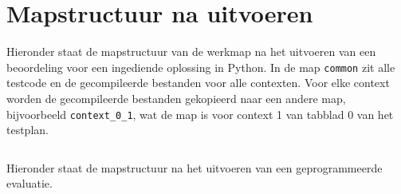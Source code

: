\chapter{Mapstructuur na uitvoeren}\label{ch:mapstructuur-na-uitvoeren}

Hieronder staat de mapstructuur van de werkmap na het uitvoeren van een beoordeling voor een ingediende oplossing in Python.
In de map \texttt{common} zit alle testcode en de gecompileerde bestanden voor alle contexten.
Voor elke context worden de gecompileerde bestanden gekopieerd naar een andere map, bijvoorbeeld \texttt{context\_0\_1}, wat de map is voor context 1 van tabblad 0 van het testplan.

\inputminted{text}{code/dirs-python-solution.txt}

Hieronder staat de mapstructuur na het uitvoeren van een geprogrammeerde evaluatie.

\inputminted{text}{code/dirs-python-eval.txt}
